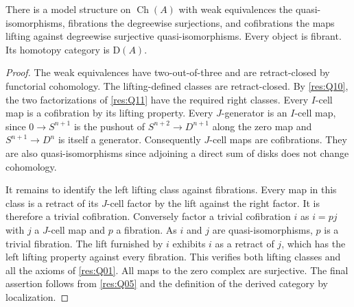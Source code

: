 \begin{theorem}\label{res:Q12}
There is a model structure on \(\operatorname{Ch}(A)\)
with weak equivalences the quasi-isomorphisms, fibrations
the degreewise surjections, and cofibrations the maps
lifting against degreewise surjective quasi-isomorphisms.
Every object is fibrant. Its homotopy category is
\(\mathrm D(A)\).
\end{theorem}
\begin{proof}
The weak equivalences have two-out-of-three and are
retract-closed by functorial cohomology. The lifting-defined
classes are retract-closed. By \ref{res:Q10}, the two
factorizations of \ref{res:Q11} have the required right
classes. Every \(I\)-cell map is a cofibration by its
lifting property. Every \(J\)-generator is an \(I\)-cell
map, since \(0\to S^{n+1}\) is the pushout of
\(S^{n+2}\to D^{n+1}\) along the zero map and
\(S^{n+1}\to D^n\) is itself a generator. Consequently
\(J\)-cell maps are cofibrations. They are also
quasi-isomorphisms since adjoining a direct sum of disks
does not change cohomology.

It remains to identify the left lifting class against
fibrations. Every map in this class is a retract of its
\(J\)-cell factor by the lift against the right factor.
It is therefore a trivial cofibration. Conversely
factor a trivial cofibration \(i\) as \(i=pj\) with \(j\)
a \(J\)-cell map and \(p\) a fibration. As \(i\) and \(j\)
are quasi-isomorphisms, \(p\) is a trivial fibration.
The lift furnished by \(i\) exhibits \(i\) as a retract
of \(j\), which has the left lifting property against
every fibration. This verifies both lifting classes and
all the axioms of \ref{res:Q01}. All maps to the zero complex
are surjective. The final assertion follows from \ref{res:Q05}
and the definition of the derived category by localization.
\end{proof}

